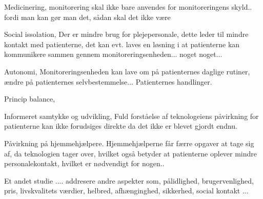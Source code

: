 Medicinering, 
monitorering skal ikke bare anvendes for monitoreringens skyld.. fordi man kan gør man det, sådan skal det ikke være

Social issolation, 
Der er mindre brug for plejepersonale, dette leder til mindre kontakt med patienterne, det kan evt. laves en løsning i at patienterne kan kommunikere sammen gennem monitoreringsenheden... noget noget...

Autonomi, 
Monitoreringsenheden kan lave om på patienternes daglige rutiner, ændre på patienternes selvbestemmelse... Patienternes handlinger.

Princip balance, 


Informeret samtykke og udvikling, 
Fuld forståelse af teknologeiens påvirkning for patienterne kan ikke forudsiges direkte da det ikke er blevet gjordt endnu.

Påvirkning på hjemmehjælpere.
Hjemmehjælperne får færre opgaver at tage sig af, da teknologien tager over, hvilket også betyder at patienterne oplever mindre personalekontakt, hvilket er nødvendigt for nogen..

\citep{Mittelstand2011}

Et andet studie .... addresere andre aspekter som, pålidlighed, brugervenlighed, pris, livskvalitets værdier, helbred, afhænginghed, sikkerhed, social kontakt ...
\citep{Nordgren2013}